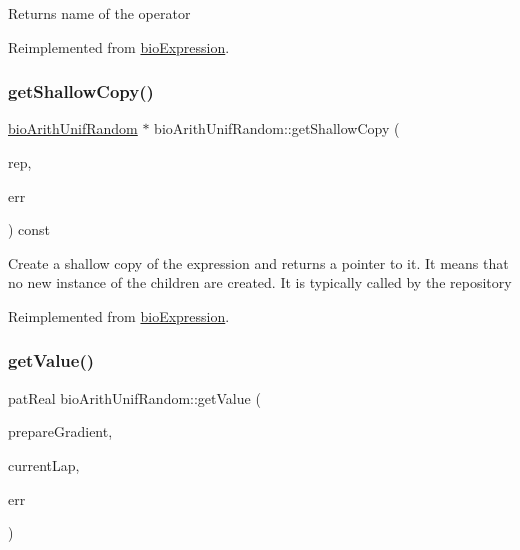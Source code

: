 \begin{DoxyReturn}{Returns}
name of the operator 
\end{DoxyReturn}


Reimplemented from \hyperlink{classbio_expression_a2353a4afb3a2b0af7c63aba086a72bde}{bio\+Expression}.

\mbox{\label{classbio_arith_unif_random_a8e81dcec495449b481729aa3769696ad}} 
\subsubsection{\texorpdfstring{get\+Shallow\+Copy()}{getShallowCopy()}}
{\footnotesize\ttfamily \hyperlink{classbio_arith_unif_random}{bio\+Arith\+Unif\+Random} $\ast$ bio\+Arith\+Unif\+Random\+::get\+Shallow\+Copy (\begin{DoxyParamCaption}\item[{\hyperlink{classbio_expression_repository}{bio\+Expression\+Repository} $\ast$}]{rep,  }\item[{pat\+Error $\ast$\&}]{err }\end{DoxyParamCaption}) const\hspace{0.3cm}{\ttfamily [virtual]}}

Create a shallow copy of the expression and returns a pointer to it. It means that no new instance of the children are created. It is typically called by the repository 

Reimplemented from \hyperlink{classbio_expression_a442534762693b92baaf33928979a1bf8}{bio\+Expression}.

\mbox{\label{classbio_arith_unif_random_adf48d57d0dc6d518950c58dc13b65a32}} 
\subsubsection{\texorpdfstring{get\+Value()}{getValue()}}
{\footnotesize\ttfamily pat\+Real bio\+Arith\+Unif\+Random\+::get\+Value (\begin{DoxyParamCaption}\item[{pat\+Boolean}]{prepare\+Gradient,  }\item[{pat\+U\+Long}]{current\+Lap,  }\item[{pat\+Error $\ast$\&}]{err }\end{DoxyParamCaption})\hspace{0.3cm}{\ttfamily [virtual]}}

